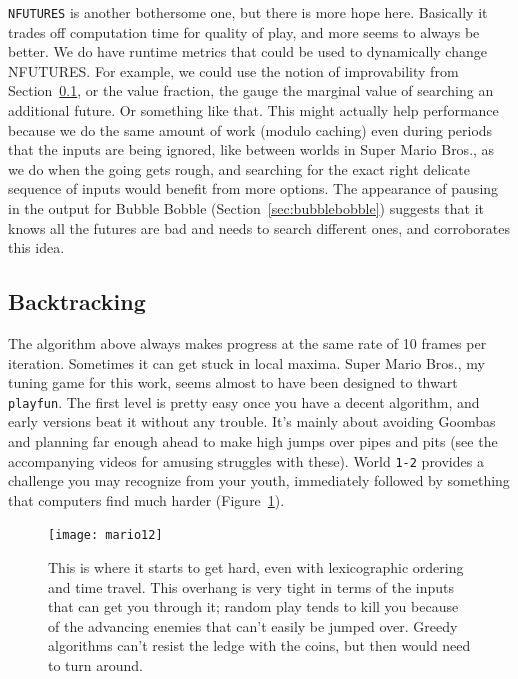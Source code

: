 \documentclass[twocolumn]{article}
\begin{document}
{  {\tt NFUTURES} is another bothersome one, but there is more hope here.
  Basically it trades off computation time for quality of play, and
  more seems to always be better. We do have runtime metrics that could
  be used to dynamically change NFUTURES. For example, we could use
  the notion of improvability from Section~\ref{sec:backtracking}, or
  the value fraction, the gauge the marginal value of searching an
  additional future. Or something like that. This might actually help
  performance because we do the same amount of work (modulo caching)
  even during periods that the inputs are being ignored, like between
  worlds in Super Mario Bros., as we do when the going gets rough,
  and searching for the exact right delicate sequence of inputs would
  benefit from more options. The appearance of pausing in the output
  for Bubble Bobble (Section~\ref{sec:bubblebobble}) suggests that it
  knows all the futures are bad and needs to search different ones,
  and corroborates this idea.}

\subsection{Backtracking} \label{sec:backtracking}

The algorithm above always makes progress at the same rate of 10
frames per iteration. Sometimes it can get stuck in local maxima.
Super Mario Bros., my tuning game for this work, seems almost to have
been designed to thwart {\tt playfun}. The first level is pretty easy
once you have a decent algorithm, and early versions beat it without
any trouble. It's mainly about avoiding Goombas and planning far
enough ahead to make high jumps over pipes and pits (see the
accompanying videos for amusing struggles with these). World {\tt 1-2}
provides a challenge you may recognize from your youth, immediately
followed by something that computers find much harder
(Figure~\ref{fig:mario12}).

\begin{figure}[h!tb]
\begin{center}
\texttt{[image: mario12]}
\end{center}\vspace{-0.1in}
\caption{This is where it starts to get hard, even with lexicographic
ordering and time travel. This overhang is very tight in terms of the
inputs that can get you through it; random play tends to kill you because
of the advancing enemies that can't easily be jumped over. Greedy
algorithms can't resist the ledge with the coins, but then would need to
turn around.}
\label{fig:mario12}
\end{figure}
\end{document}
